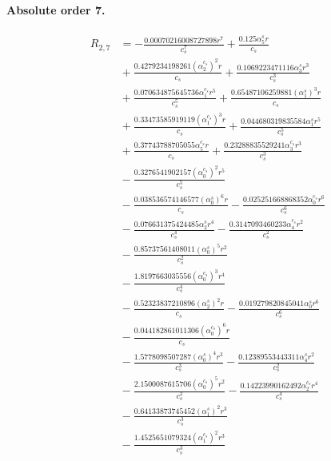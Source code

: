 \documentclass[10pt]{article}
\begin{document}
\paragraph{Absolute order 7.}
\begin{align*}
R_{2,7} &=  - \frac{0.00070216008727898 r^{7}}{c_{s}^{7}} + \frac{0.125 \alpha_{5}^s r}{c_{s}} \\
&{}  + \frac{0.4279234198261 \left(\alpha_{2}^{c_s}\right)^{2} r}{c_{s}} + \frac{0.1069223471116 \alpha_{3}^s r^{3}}{c_{s}^{3}} \\
&{}  + \frac{0.070634875645736 \alpha_{1}^{c_s} r^{5}}{c_{s}^{5}} + \frac{0.65487106259881 \left(\alpha_{1}^s\right)^{3} r}{c_{s}} \\
&{}  + \frac{0.33473585919119 \left(\alpha_{1}^{c_s}\right)^{3} r}{c_{s}} + \frac{0.044680319835584 \alpha_{1}^s r^{5}}{c_{s}^{5}} \\
&{}  + \frac{0.37743788705055 \alpha_{5}^{c_s} r}{c_{s}} + \frac{0.23288835529241 \alpha_{3}^{c_s} r^{3}}{c_{s}^{3}} \\
&{}  - \frac{0.3276541902157 \left(\alpha_{0}^{c_s}\right)^{2} r^{5}}{c_{s}^{5}} \\
&{}  - \frac{0.038536574146577 \left(\alpha_{0}^s\right)^{6} r}{c_{s}} - \frac{0.025251668868352 \alpha_{0}^{c_s} r^{6}}{c_{s}^{6}} \\
&{}  - \frac{0.076631375424485 \alpha_{2}^s r^{4}}{c_{s}^{4}} - \frac{0.3147093460233 \alpha_{4}^{c_s} r^{2}}{c_{s}^{2}} \\
&{}  - \frac{0.85737561408011 \left(\alpha_{0}^s\right)^{5} r^{2}}{c_{s}^{2}} \\
&{}  - \frac{1.8197663035556 \left(\alpha_{0}^{c_s}\right)^{3} r^{4}}{c_{s}^{4}} \\
&{}  - \frac{0.52323837210896 \left(\alpha_{2}^s\right)^{2} r}{c_{s}} - \frac{0.019279820845041 \alpha_{0}^s r^{6}}{c_{s}^{6}} \\
&{}  - \frac{0.044182861011306 \left(\alpha_{0}^{c_s}\right)^{6} r}{c_{s}} \\
&{}  - \frac{1.5778098507287 \left(\alpha_{0}^s\right)^{4} r^{3}}{c_{s}^{3}} - \frac{0.12389553443311 \alpha_{4}^s r^{2}}{c_{s}^{2}} \\
&{}  - \frac{2.1500087615706 \left(\alpha_{0}^{c_s}\right)^{5} r^{2}}{c_{s}^{2}} - \frac{0.14223990162492 \alpha_{2}^{c_s} r^{4}}{c_{s}^{4}} \\
&{}  - \frac{0.64133873745452 \left(\alpha_{1}^s\right)^{2} r^{3}}{c_{s}^{3}} \\
&{}  - \frac{1.4525651079324 \left(\alpha_{1}^{c_s}\right)^{2} r^{3}}{c_{s}^{3}} \\

\end{align*}
\end{document}
